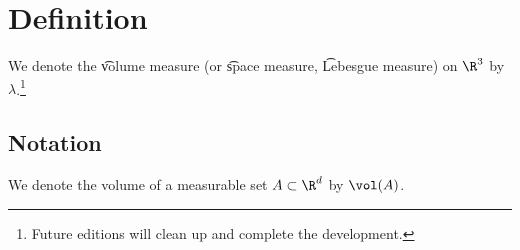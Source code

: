 
\section*{Definition}

We denote the \t{volume measure} (or \t{space measure}, \t{Lebesgue measure}) on $\R ^3$ by $\lambda $.\footnote{Future editions will clean up and complete the development.}

\subsection*{Notation}

We denote the volume of a measurable set $A \subset \R ^d$ by $\vol(A)$.

\blankpage